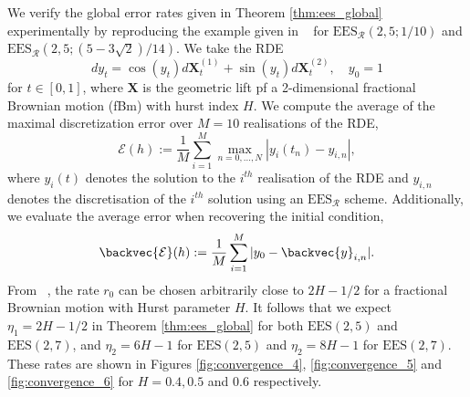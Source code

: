 \documentclass{article} %
\theoremstyle{definition}
\theoremstyle{remark}
\begin{document}


We verify the global error rates given in Theorem \ref{thm:ees_global} experimentally by reproducing the example given in ~\citep{redmann2020runge, deya2012milstein} for $\mathrm{EES}_\mathcal{R}(2,5; 1/10)$ and $\mathrm{EES}_\mathcal{R}(2,5; (5 - 3\sqrt{2}) / 14)$. We take the RDE
\begin{equation*}
    dy_t = \cos(y_t) d\mathbf{X}^{(1)}_t + \sin(y_t)d\mathbf{X}^{(2)}_t, \quad y_0 = 1
\end{equation*}
for $t \in [0,1]$, where $\mathbf{X}$ is the geometric lift pf a 2-dimensional fractional Brownian motion (fBm) with hurst index $H$. We compute the average of the maximal discretization error over $M = 10$ realisations of the RDE,
\begin{equation*}
    \mathcal{E}(h) := \frac{1}{M}\sum_{i=1}^M \max_{n=0,\ldots, N} |y_i(t_n) - y_{i,n}|,
\end{equation*}
where $y_i(t)$ denotes the solution to the $i^{th}$ realisation of the RDE and $y_{i,n}$ denotes the discretisation of the $i^{th}$ solution using an $\mathrm{EES}_\mathcal{R}$ scheme. Additionally, we evaluate the average error when recovering the initial condition,
\begin{equation*}
    \backvec{\mathcal{E}}(h) := \frac{1}{M}\sum_{i=1}^M |y_0 - \backvec{y}_{i,n}|.
\end{equation*}
From ~\citep{friz2014convergence}, the rate $r_0$ can be chosen arbitrarily close to $2H - 1/2$ for a fractional Brownian motion with Hurst parameter $H$. It follows that we expect $\eta_1 = 2H - 1/2$ in Theorem \ref{thm:ees_global} for both $\mathrm{EES}(2,5)$ and $\mathrm{EES}(2,7)$, and $\eta_2 = 6H-1$ for $\mathrm{EES}(2,5)$ and $\eta_2 = 8H-1$ for $\mathrm{EES}(2,7)$. These rates are shown in Figures \ref{fig:convergence_4}, \ref{fig:convergence_5} and \ref{fig:convergence_6} for $H = 0.4, 0.5$ and $0.6$ respectively.
\end{document}
